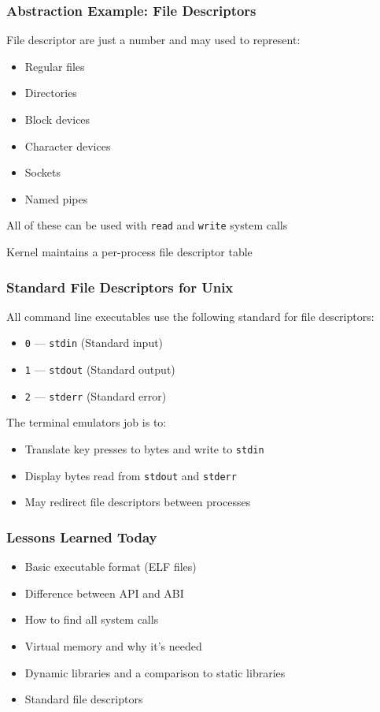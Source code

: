 \documentclass[aspectratio=169]{beamer}
\begin{document}
  \begin{frame}
    \frametitle{Abstraction Example: File Descriptors}

    File descriptor are just a number and may used to represent:
    \begin{itemize}
      \item Regular files
      \item Directories
      \item Block devices
      \item Character devices
      \item Sockets
      \item Named pipes
    \end{itemize}

    All of these can be used with \texttt{read} and \texttt{write} system calls

    \vspace{1em}

    Kernel maintains a per-process file descriptor table
  \end{frame}

  \begin{frame}
    \frametitle{Standard File Descriptors for Unix}

    All command line executables use the following standard for file
    descriptors:

    \begin{itemize}
      \item \texttt{0} --- \texttt{stdin} (Standard input)
      \item \texttt{1} --- \texttt{stdout} (Standard output)
      \item \texttt{2} --- \texttt{stderr} (Standard error)
    \end{itemize}

    \vspace{2em}

    The terminal emulators job is to:
    \begin{itemize}
      \item Translate key presses to bytes and write to \texttt{stdin}
      \item Display bytes read from \texttt{stdout} and \texttt{stderr}
      \item May redirect file descriptors between processes
    \end{itemize}
  \end{frame}

  \begin{frame}
    \frametitle{Lessons Learned Today}

    \begin{itemize}
      \item Basic executable format (ELF files)
      \item Difference between API and ABI
      \item How to find all system calls
      \item Virtual memory and why it's needed
      \item Dynamic libraries and a comparison to static libraries
      \item Standard file descriptors
    \end{itemize}
  \end{frame}
\end{document}
